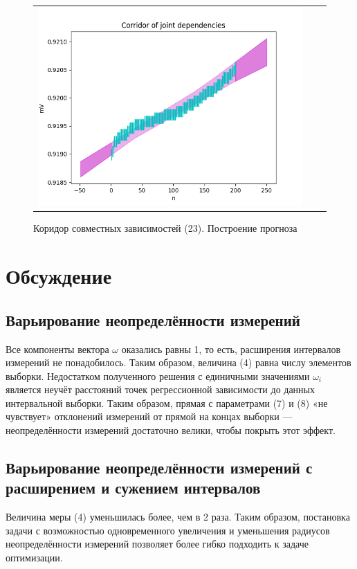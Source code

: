 \documentclass[a4paper,14pt]{article}
\begin{document}
	\begin{figure}[H]
		\begin{center}
			\begin{tabular}{ccc}
				\includegraphics[scale=0.8]{../image/intervals2.png}
			\end{tabular}
		\end{center}
		\caption{Коридор совместных зависимостей (23). Построение прогноза} 
	\end{figure}

	\section{Обсуждение}
	\subsection{Варьирование неопределённости измерений}
	Все компоненты вектора $\omega$ оказались равны 1, то есть, расширения интервалов измерений не понадобилось. Таким образом, величина (4) равна числу элементов выборки. Недостатком полученного решения с единичными значениями $\omega_i$ является неучёт расстояний точек
	регрессионной зависимости до данных интервальной выборки. Таким образом, прямая с параметрами (7) и (8) «не чувствует» отклонений измерений от прямой на концах выборки — неопределённости измерений достаточно велики, чтобы покрыть этот эффект.
	
	\subsection{Варьирование неопределённости измерений с расширением и сужением интервалов}
	Величина меры (4) уменьшилась более, чем в 2 раза. Таким образом, постановка задачи с возможностью одновременного увеличения и уменьшения радиусов неопределённости измерений позволяет более гибко подходить к задаче оптимизации.
	
\end{document}
